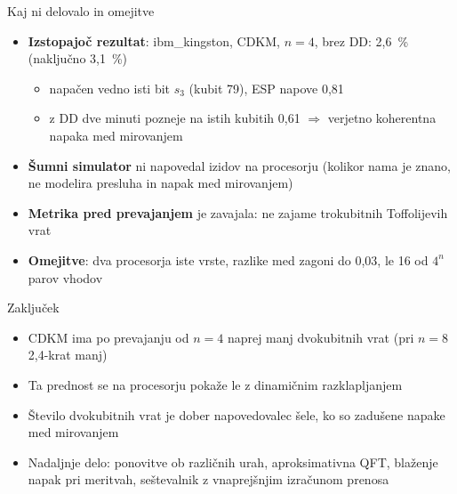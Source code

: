 \documentclass[aspectratio=169,11pt]{beamer}
\begin{document}
\begin{frame}{Kaj ni delovalo in omejitve}
\small
\begin{itemize}
  \item \textbf{Izstopajoč rezultat}: ibm\_kingston, CDKM, $n = 4$, brez DD: 2,6~\% (naključno 3,1~\%)
  \begin{itemize}
    \item napačen vedno isti bit $s_3$ (kubit 79), ESP napove 0,81
    \item z DD dve minuti pozneje na istih kubitih 0,61 $\Rightarrow$ verjetno koherentna napaka med mirovanjem
  \end{itemize}
  \item \textbf{Šumni simulator} ni napovedal izidov na procesorju (kolikor nama je znano, ne modelira presluha in napak med mirovanjem)
  \item \textbf{Metrika pred prevajanjem} je zavajala: ne zajame trokubitnih Toffolijevih vrat
  \item \textbf{Omejitve}: dva procesorja iste vrste, razlike med zagoni do 0,03, le 16 od $4^n$ parov vhodov
\end{itemize}
\end{frame}

\begin{frame}{Zaključek}
\begin{itemize}
  \item CDKM ima po prevajanju od $n = 4$ naprej manj dvokubitnih vrat (pri $n = 8$ 2,4-krat manj)
  \item Ta prednost se na procesorju pokaže \alert{le z dinamičnim razklapljanjem}
  \item Število dvokubitnih vrat je dober napovedovalec šele, ko so zadušene napake med mirovanjem
  \item Nadaljnje delo: ponovitve ob različnih urah, aproksimativna QFT, blaženje napak pri meritvah, seštevalnik z vnaprejšnjim izračunom prenosa
\end{itemize}
\end{frame}
\end{document}
